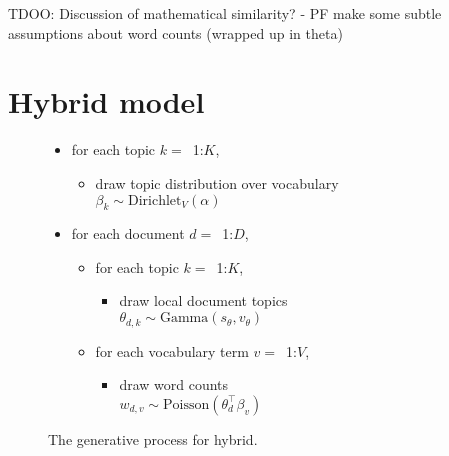 \documentclass[11pt,letterpaper]{article}
\begin{document}
TDOO: 
Discussion of mathematical similarity?
- PF make some subtle assumptions about word counts (wrapped up in theta)

\section{Hybrid model}
\begin{figure}
\begin{mdframed}
\small
\begin{itemize}[leftmargin=*]
\item for each topic $k=$~1:$K$,
	\begin{itemize}[leftmargin=*]
		\item draw topic distribution over vocabulary \\$\beta_k \sim \mbox{Dirichlet}_V (\alpha)$
	\end{itemize}
\item for each document $d=$~1:$D$,
	\begin{itemize}[leftmargin=*]
		\item for each topic $k=$~1:$K$,
		\begin{itemize}[leftmargin=*]
			\item draw local document topics \\$\theta_{d,k} \sim \mbox{Gamma}(s_\theta, v_\theta)$
		\end{itemize}
		\item for each vocabulary term $v=$~1:$V$,
		\begin{itemize}[leftmargin=*]
			\item draw word counts \\$w_{d,v} \sim \mbox{Poisson}\left(\theta_d^\top\beta_v\right)$
		\end{itemize}
	\end{itemize}
\end{itemize}
\end{mdframed}
\caption{The generative process for hybrid.}
\label{fig:generative-hybrid}
\end{figure}
\end{document}
